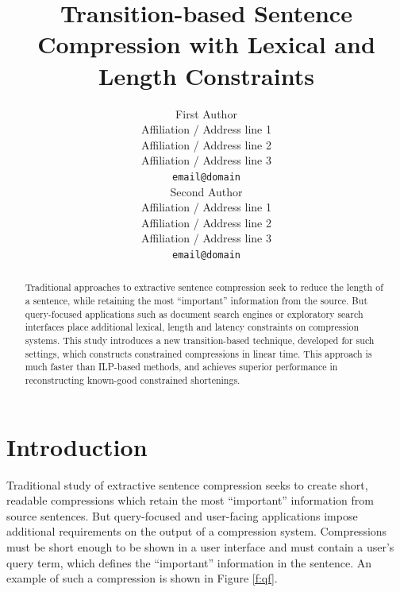 \documentclass[11pt,a4paper]{article}
\title{Transition-based Sentence Compression with Lexical and Length Constraints}
\author{First Author \\
  Affiliation / Address line 1 \\
  Affiliation / Address line 2 \\
  Affiliation / Address line 3 \\
  {\tt email@domain} \\\And
  Second Author \\
  Affiliation / Address line 1 \\
  Affiliation / Address line 2 \\
  Affiliation / Address line 3 \\
  {\tt email@domain} \\}
\date{}
\newcommand{\ahcomment}[1]{\textcolor{blue}{[#1 -AH]}}
\begin{document}
\maketitle




\begin{abstract}
Traditional approaches to extractive sentence compression seek to reduce the length of a sentence, while retaining the most ``important'' information from the source. But query-focused applications such as document search engines or exploratory search interfaces place additional lexical, length and latency constraints on compression systems. This study introduces a new transition-based technique, developed for such settings, which constructs constrained compressions in linear time. This approach is much faster than ILP-based methods, and achieves superior performance in reconstructing known-good constrained shortenings.
\end{abstract}

\section{Introduction}

Traditional study of extractive sentence compression seeks to create short, readable compressions which retain the most ``important'' information from source sentences. But query-focused and user-facing applications impose additional requirements on the output of a compression system. Compressions must be short enough to be shown in a user interface and must contain a user's query term, which defines the ``important'' information in the sentence. An example of such a compression is shown in Figure \ref{f:qf}.
\end{document}
